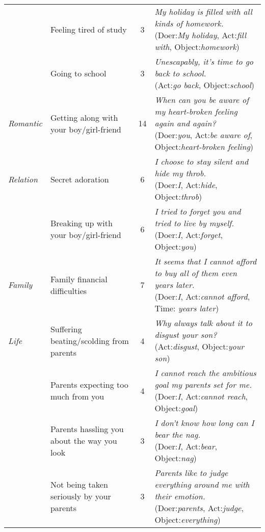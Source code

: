 \begin{table*}
\begin{center}
\begin{footnotesize}
\begin{tabular}{llcl}
&	Feeling tired of study	&	3	&
\tabincell{l}{\emph{My holiday is filled with all kinds of homework.}
\\(Doer:\emph{My holiday}, Act:\emph{fill with}, Object:\emph{homework})}\\ \cline{2-4}
&	Going to school	&	3	&
\tabincell{l}{\emph{Unescapably, it's time to go back to school.}
\\(Act:\emph{go back}, Object:\emph{school})}\\ \hline
\emph{Romantic}	&	Getting along with your boy/girl-friend	&14	&
\tabincell{l}{\emph{When can you be aware of my heart-broken feeling again and again?}
\\(Doer:\emph{you}, Act:\emph{be aware of}, Object:\emph{heart-broken feeling})}\\ \cline{2-4}
\emph{Relation} &	Secret adoration	&	6	&
\tabincell{l}{\emph{I choose to stay silent and hide my throb.}
\\(Doer:\emph{I}, Act:\emph{hide}, Object:\emph{throb})}\\ \cline{2-4}
&	Breaking up with your boy/girl-friend	&	6	&
\tabincell{l}{\emph{I tried to forget you and tried to live by myself.}
\\(Doer:\emph{I}, Act:\emph{forget}, Object:\emph{you})}\\ \hline
\emph{Family}	&	Family financial difficulties	&	7	&
\tabincell{l}{\emph{It seems that I cannot afford to buy all of them even years later.}
\\(Doer:\emph{I}, Act:\emph{cannot afford}, Time: \emph{years later})}\\ \cline{2-4}
\emph{Life}	&	Suffering beating/scolding from parents	&	4	&
\tabincell{l}{\emph{Why always talk about it to disgust your son?}
\\(Act:\emph{disgust}, Object:\emph{your son})}\\ \cline{2-4}
&	Parents expecting too much from you	&	4	&
\tabincell{l}{\emph{I cannot reach the ambitious goal my parents set for me.}
\\(Doer:\emph{I}, Act:\emph{cannot reach}, Object:\emph{goal})}\\ \cline{2-4}
&	Parents hassling you about the way you look	&	3	&
\tabincell{l}{\emph{I don't know how long can I bear the nag.}
\\(Doer:\emph{I}, Act:\emph{bear}, Object:\emph{nag})}\\ \cline{2-4}
&	Not being taken seriously by your parents	&	3	&
\tabincell{l}{\emph{Parents like to judge everything around me with their emotion. }
\\(Doer:\emph{parents}, Act:\emph{judge}, Object:\emph{everything})}\\ \cline{2-4}

\end{tabular}
\end{footnotesize}
\end{center}
\end{table*}
